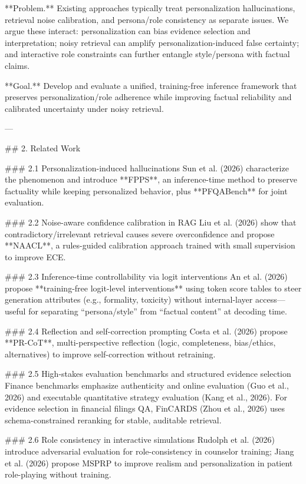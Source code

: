 **Problem.** Existing approaches typically treat personalization hallucinations, retrieval noise calibration, and persona/role consistency as separate issues. We argue these interact: personalization can bias evidence selection and interpretation; noisy retrieval can amplify personalization-induced false certainty; and interactive role constraints can further entangle style/persona with factual claims.

**Goal.** Develop and evaluate a unified, training-free inference framework that preserves personalization/role adherence while improving factual reliability and calibrated uncertainty under noisy retrieval.

---

## 2. Related Work  

### 2.1 Personalization-induced hallucinations  
Sun et al. (2026) characterize the phenomenon and introduce **FPPS**, an inference-time method to preserve factuality while keeping personalized behavior, plus **PFQABench** for joint evaluation.

### 2.2 Noise-aware confidence calibration in RAG  
Liu et al. (2026) show that contradictory/irrelevant retrieval causes severe overconfidence and propose **NAACL**, a rules-guided calibration approach trained with small supervision to improve ECE.

### 2.3 Inference-time controllability via logit interventions  
An et al. (2026) propose **training-free logit-level interventions** using token score tables to steer generation attributes (e.g., formality, toxicity) without internal-layer access—useful for separating “persona/style” from “factual content” at decoding time.

### 2.4 Reflection and self-correction prompting  
Costa et al. (2026) propose **PR-CoT**, multi-perspective reflection (logic, completeness, bias/ethics, alternatives) to improve self-correction without retraining.

### 2.5 High-stakes evaluation benchmarks and structured evidence selection  
Finance benchmarks emphasize authenticity and online evaluation (Guo et al., 2026) and executable quantitative strategy evaluation (Kang et al., 2026). For evidence selection in financial filings QA, FinCARDS (Zhou et al., 2026) uses schema-constrained reranking for stable, auditable retrieval.

### 2.6 Role consistency in interactive simulations  
Rudolph et al. (2026) introduce adversarial evaluation for role-consistency in counselor training; Jiang et al. (2026) propose MSPRP to improve realism and personalization in patient role-playing without training.

